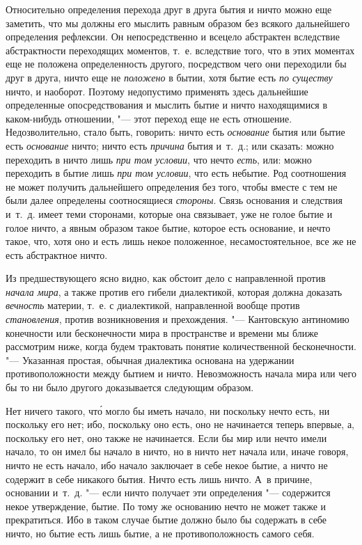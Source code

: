 Относительно определения перехода друг в друга бытия и ничто можно еще
заметить, что мы должны его мыслить равным образом без всякого дальнейшего
определения рефлексии. Он непосредственно и всецело абстрактен вследствие
абстрактности переходящих моментов, т.~е. вследствие того, что в этих моментах
еще не положена определенность другого, посредством чего они переходили бы друг
в друга, ничто еще не {\em положено} в бытии, хотя бытие есть {\em по существу}
ничто, и наоборот. Поэтому недопустимо применять здесь дальнейшие определенные
опосредствования и мыслить бытие и ничто находящимися в каком-нибудь отношении,
"--- этот переход еще не есть отношение. Недозволительно, стало быть, говорить:
ничто есть {\em основание} бытия или бытие есть {\em основание} ничто; ничто
есть {\em причина} бытия и~т.~д.; или сказать: можно переходить в ничто лишь
{\em при том условии}, что нечто {\em есть}, или: можно переходить в бытие лишь
{\em при том условии}, что есть небытие. Род соотношения не может получить
дальнейшего определения без того, чтобы вместе с тем не были далее определены
соотносящиеся {\em стороны}. Связь основания и следствия и~т.~д. имеет теми
сторонами, которые она связывает, уже не голое бытие и голое ничто, а явным
образом такое бытие, которое есть основание, и нечто такое, что, хотя оно и
есть лишь некое положенное, несамостоятельное, все же не есть
абстрактное ничто.


Из предшествующего ясно видно, как обстоит дело с направленной против
{\em начала мира}, а также против его гибели диалектикой, которая должна
доказать {\em вечность} материи, т.~е. с диалектикой, направленной вообще
против {\em становления}, против возникновения и прехождения. "--- Кантовскую
антиномию конечности или бесконечности мира в пространстве и времени мы ближе
рассмотрим ниже, когда будем трактовать понятие количественной бесконечности.
"--- Указанная простая, обычная диалектика основана на удержании
противоположности между бытием и ничто. Невозможность начала мира или чего бы
то ни было другого доказывается следующим образом.

Нет ничего такого, чт\'{о} могло бы иметь начало, ни поскольку нечто есть, ни
поскольку его нет; ибо, поскольку оно есть, оно не начинается теперь впервые,
а, поскольку его нет, оно также не начинается. Если бы мир или нечто имели
начало, то он имел бы начало в ничто, но в ничто нет начала или, иначе говоря,
ничто не есть начало, ибо начало заключает в себе некое бытие, а ничто не
содержит в себе никакого бытия. Ничто есть лишь ничто. А~в причине, основании
и~т.~д. "--- если ничто получает эти определения "--- содержится некое
утверждение, бытие. По тому же основанию нечто не может также и прекратиться.
Ибо в таком случае бытие должно было бы содержать в себе ничто, но бытие есть
лишь бытие, а не противоположность самого себя.

